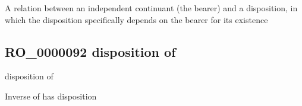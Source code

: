 \documentclass[letterpaper,10pt,english]{sphinxmanual}
\begin{document}
\begin{sphinxShadowBox}

\sphinxAtStartPar
{\hyperref[\detokenize{doc-RO_0000053::doc}]{}}
\end{sphinxShadowBox}

\begin{sphinxShadowBox}

\sphinxAtStartPar
A relation between an independent continuant (the bearer) and a disposition, in which the disposition specifically depends on the bearer for its existence
\end{sphinxShadowBox}

\begin{sphinxShadowBox}

\sphinxAtStartPar
{}
\end{sphinxShadowBox}
\begin{quote}

\ignorespaces \end{quote}


\subsection{RO\_0000092 \sphinxhyphen{} disposition of}
\label{\detokenize{doc-RO_0000092:ro-0000092-disposition-of}}\label{\detokenize{doc-RO_0000092:index-0}}\label{\detokenize{doc-RO_0000092::doc}}
\begin{sphinxShadowBox}

\sphinxAtStartPar
disposition of
\end{sphinxShadowBox}

\begin{sphinxShadowBox}

\sphinxAtStartPar
{\hyperref[\detokenize{doc-RO_0000052::doc}]{}}
\end{sphinxShadowBox}

\begin{sphinxShadowBox}

\sphinxAtStartPar
Inverse of has disposition
\end{sphinxShadowBox}
\end{document}
